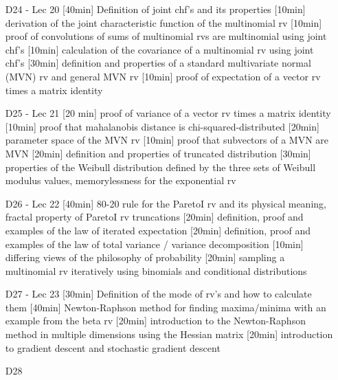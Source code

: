 \begin{enumerate}
\item[D24 - Lec 20] [40min] Definition of joint chf's and its properties [10min] derivation of the joint characteristic function of the multinomial rv [10min] proof of convolutions of sums of multinomial rvs are multinomial using joint chf's [10min] calculation of the covariance of a multinomial rv using joint chf's [30min] definition and properties of a standard multivariate normal (MVN) rv and general MVN rv [10min] proof of expectation of a vector rv times a matrix identity

\item[D25 - Lec 21] [20 min] proof of variance of a vector rv times a matrix identity [10min] proof that mahalanobis distance is chi-squared-distributed [20min] parameter space of the MVN rv [10min] proof that subvectors of a MVN are MVN [20min] definition and properties of truncated distribution [30min] properties of the Weibull distribution defined by the three sets of Weibull modulus values, memorylessness for the exponential rv

\item[D26 - Lec 22] [40min] 80-20 rule for the ParetoI rv and its physical meaning, fractal property of ParetoI rv truncations [20min] definition, proof and examples of the law of iterated expectation  [20min] definition, proof and examples of the law of total variance / variance decomposition [10min] differing views of the philosophy of probability [20min] sampling a multinomial rv iteratively using binomials and conditional distributions

\item[D27 - Lec 23] [30min] Definition of the mode of rv's and how to calculate them [40min] Newton-Raphson method for finding maxima/minima with an example from the beta rv [20min] introduction to the Newton-Raphson method in multiple dimensions using the Hessian matrix [20min] introduction to gradient descent and stochastic gradient descent

\item[D28] 

\end{enumerate}